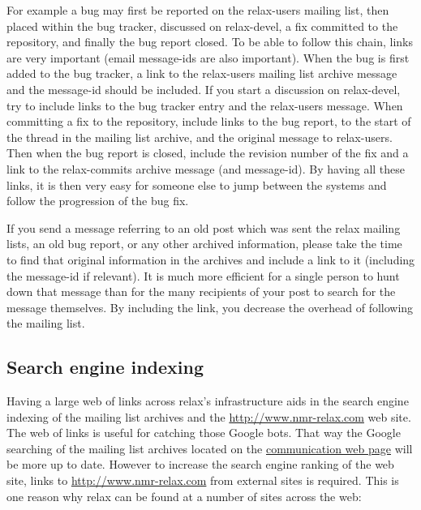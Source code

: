 For example a bug may first be reported on the relax-users mailing list, then placed within the bug tracker, discussed on relax-devel, a fix committed to the repository, and finally the bug report closed.  To be able to follow this chain, links are very important (email message-ids are also important).  When the bug is first added to the bug tracker, a link to the relax-users mailing list archive message and the message-id should be included.  If you start a discussion on relax-devel, try to include links to the bug tracker entry and the relax-users message.  When committing a fix to the repository, include links to the bug report, to the start of the thread in the mailing list archive, and the original message to relax-users.  Then when the bug report is closed, include the revision number of the fix and a link to the relax-commits archive message (and message-id).  By having all these links, it is then very easy for someone else to jump between the systems and follow the progression of the bug fix.

If you send a message referring to an old post which was sent the relax mailing lists, an old bug report, or any other archived information, please take the time to find that original information in the archives and include a link to it (including the message-id if relevant).  It is much more efficient for a single person to hunt down that message than for the many recipients of your post to search for the message themselves.  By including the link, you decrease the overhead of following the mailing list.



\subsection{Search engine indexing}

Having a large web of links across relax's infrastructure aids in the search engine indexing of the mailing list archives and the \href{http://www.nmr-relax.com}{http://www.nmr-relax.com} web site.  The web of links is useful for catching those Google bots.  That way the Google searching of the mailing list archives located on the \href{http://www.nmr-relax.com/\-communication.html}{communication web page} will be more up to date.  However to increase the search engine ranking of the web site, links to \href{http://www.nmr-relax.com}{http://www.nmr-relax.com} from external sites is required.  This is one reason why relax can be found at a number of sites across the web:

